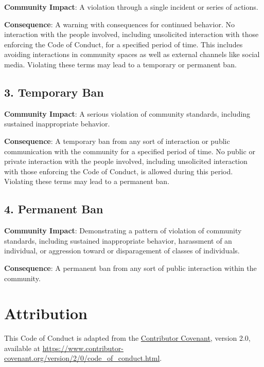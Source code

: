 \documentclass[
  fontsize=13pt,
  english,
  a4paper,
  openany, a4paper, oneside]{book}
\begin{document}
\textbf{Community Impact}: A violation through a single incident or series
of actions.

\textbf{Consequence}: A warning with consequences for continued behavior. No
interaction with the people involved, including unsolicited interaction with
those enforcing the Code of Conduct, for a specified period of time. This
includes avoiding interactions in community spaces as well as external channels
like social media. Violating these terms may lead to a temporary or
permanent ban.

\hypertarget{temporary-ban}{%
\subsection{3. Temporary Ban}\label{temporary-ban}}

\textbf{Community Impact}: A serious violation of community standards, including
sustained inappropriate behavior.

\textbf{Consequence}: A temporary ban from any sort of interaction or public
communication with the community for a specified period of time. No public or
private interaction with the people involved, including unsolicited interaction
with those enforcing the Code of Conduct, is allowed during this period.
Violating these terms may lead to a permanent ban.

\hypertarget{permanent-ban}{%
\subsection{4. Permanent Ban}\label{permanent-ban}}

\textbf{Community Impact}: Demonstrating a pattern of violation of community
standards, including sustained inappropriate behavior, harassment of an
individual, or aggression toward or disparagement of classes of individuals.

\textbf{Consequence}: A permanent ban from any sort of public interaction within
the community.

\hypertarget{attribution}{%
\section{Attribution}\label{attribution}}

This Code of Conduct is adapted from the \href{https://www.contributor-covenant.org}{Contributor Covenant},
version 2.0, available at
\url{https://www.contributor-covenant.org/version/2/0/code_of_conduct.html}.
\end{document}
